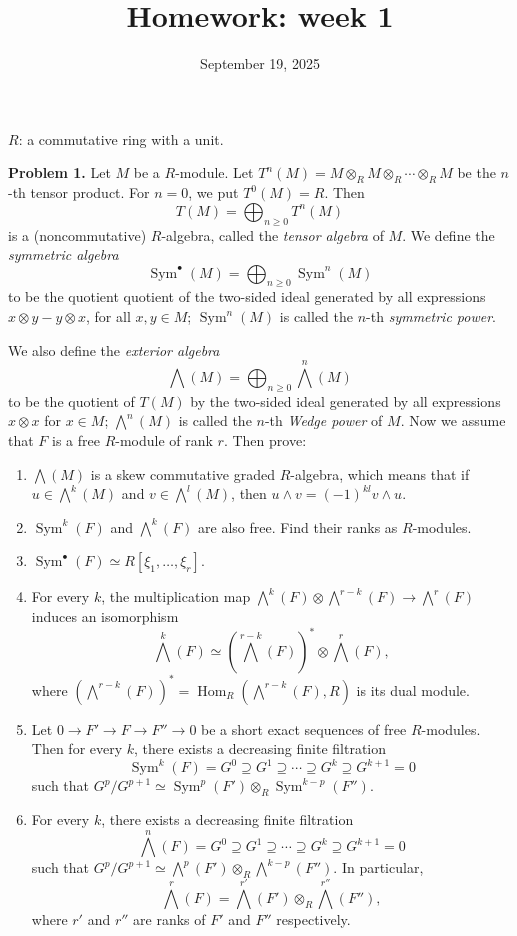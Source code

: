 \documentclass[12pt]{article}
\title{Homework: week 1}
\date{September 19, 2025}
\begin{document}
\maketitle

$R$: a commutative ring with a unit.

\bigskip
\noindent
\textbf{Problem 1.} Let $M$ be a $R$-module. Let $T^n(M) = M \otimes_R M \otimes_R \cdots \otimes_R M$ be the $n$-th tensor product. For $n = 0$, we put $T^0(M) = R$. Then
\[
T(M) = \bigoplus_{n\ge 0} T^n(M)
\]
is a (noncommutative) $R$-algebra, called the \emph{tensor algebra} of $M$. We define the \emph{symmetric
algebra}
\[
\operatorname{Sym}^\bullet(M) = \bigoplus_{n\ge 0} \operatorname{Sym}^n(M)
\]
to be the quotient quotient of the two-sided ideal generated by all expressions $x \otimes y - y \otimes x$,
for all $x,y \in M$; $\operatorname{Sym}^n(M)$ is called the $n$-th \emph{symmetric power}.

We also define the \emph{exterior algebra}
\[
\bigwedge(M) = \bigoplus_{n\ge 0} \bigwedge^n(M)
\]
to be the quotient of $T(M)$ by the two-sided ideal generated by all expressions $x \otimes x$ for
$x \in M$; $\bigwedge^n(M)$ is called the $n$-th \emph{Wedge power} of $M$. Now we assume that $F$ is a free
$R$-module of rank $r$. Then prove:

\begin{enumerate}
  \item $\bigwedge(M)$ is a skew commutative graded $R$-algebra, which means that if $u \in \bigwedge^k(M)$ and
  $v \in \bigwedge^l(M)$, then $u \wedge v = (-1)^{kl} v \wedge u$.
  \item $\operatorname{Sym}^k(F)$ and $\bigwedge^k(F)$ are also free. Find their ranks as $R$-modules.
  \item $\operatorname{Sym}^\bullet(F) \simeq R[\xi_1,\ldots,\xi_r]$.
  \item For every $k$, the multiplication map $\bigwedge^k(F) \otimes \bigwedge^{r-k}(F) \to \bigwedge^r(F)$ induces an isomorphism
  \[
  \bigwedge^k(F) \simeq (\bigwedge^{r-k}(F))^* \otimes \bigwedge^r(F),
  \]
  where $(\bigwedge^{r-k}(F))^* = \operatorname{Hom}_R(\bigwedge^{r-k}(F),R)$ is its dual module.
\end{enumerate}

\begin{enumerate}
  \setcounter{enumi}{4}
  \item Let $0 \to F' \to F \to F'' \to 0$ be a short exact sequences of free $R$-modules. Then for
  every $k$, there exists a decreasing finite filtration
  \[
  \operatorname{Sym}^k(F) = G^0 \supseteq G^1 \supseteq \cdots \supseteq G^k \supseteq G^{k+1} = 0
  \]
  such that $G^p/G^{p+1} \simeq \operatorname{Sym}^p(F') \otimes_R \operatorname{Sym}^{k-p}(F'')$.
  \item For every $k$, there exists a decreasing finite filtration
  \[
  \bigwedge^n(F) = G^0 \supseteq G^1 \supseteq \cdots \supseteq G^k \supseteq G^{k+1} = 0
  \]
  such that $G^p/G^{p+1} \simeq \bigwedge^p(F') \otimes_R \bigwedge^{k-p}(F'')$. In particular,
  \[
  \bigwedge^r(F) = \bigwedge^{r'}(F') \otimes_R \bigwedge^{r''}(F''),
  \]
  where $r'$ and $r''$ are ranks of $F'$ and $F''$ respectively.
\end{enumerate}
\end{document}
